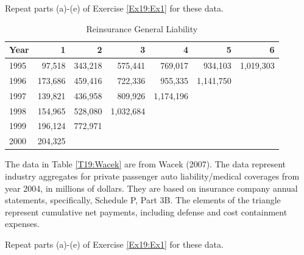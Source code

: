 \begin{exercises}
Repeat parts (a)-(e) of Exercise \ref{Ex19:Ex1} for these data.

\begin{table}[h]
 \caption{\label{T19:BraunGenLiab} Reinsurance General Liability}
\begin{center}
\begin{tabular}{lrrrrrr}
\hline
      Year &          1 &          2 &          3 &          4 &          5 &          6           \\
\hline
      1995 &     97,518 &    343,218 &    575,441 &    769,017 &    934,103 &   1,019,303           \\
      1996 &    173,686 &    459,416 &    722,336 &    955,335 &   1,141,750 &                      \\
      1997 &    139,821 &    436,958 &    809,926 &   1,174,196 &            &                      \\
      1998 &    154,965 &    528,080 &   1,032,684 &            &            &                      \\
      1999 &    196,124 &    772,971 &            &            &            &                      \\
      2000 &    204,325 &            &            &            &            &                      \\
\hline
\end{tabular}
\end{center}
\end{table}




\item The data in Table \ref{T19:Wacek} are from Wacek
(2007). The data represent industry aggregates for private passenger
auto liability/medical coverages from year 2004, in millions of
dollars. They are based on insurance company annual statements,
specifically, Schedule P, Part 3B. The elements of the triangle
represent cumulative net payments, including defense and cost
containment expenses.


Repeat parts (a)-(e) of Exercise \ref{Ex19:Ex1} for these data.




\end{exercises}
